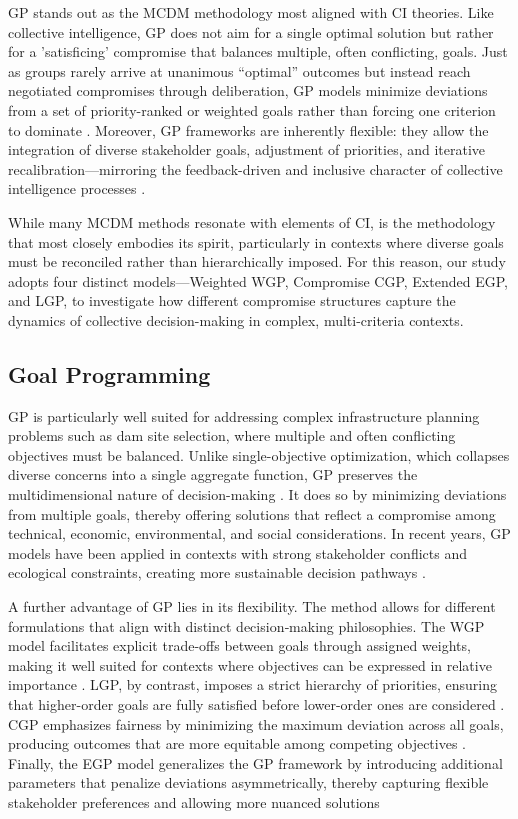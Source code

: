  \gls{GP} stands out as the MCDM methodology most aligned with CI theories. Like collective intelligence, \gls{GP} does not aim for a single optimal solution but rather for a 'satisficing' compromise that balances multiple, often conflicting, goals. Just as groups rarely arrive at unanimous “optimal” outcomes but instead reach negotiated compromises through deliberation, \gls{GP} models minimize deviations from a set of priority-ranked or weighted goals rather than forcing one criterion to dominate \cite{jones2010}. Moreover, \gls{GP} frameworks are inherently flexible: they allow the integration of diverse stakeholder goals, adjustment of priorities, and iterative recalibration—mirroring the feedback-driven and inclusive character of collective intelligence processes \cite{Borges2020}.

While many MCDM methods resonate with elements of CI,  is the methodology that most closely embodies its spirit, particularly in contexts where diverse goals must be reconciled rather than hierarchically imposed. For this reason, our study adopts four distinct  models—Weighted  \gls{WGP}, Compromise  \gls{CGP}, Extended  \gls{EGP}, and \gls{LGP}, to investigate how different compromise structures capture the dynamics of collective decision-making in complex, multi-criteria contexts.

\subsection{Goal Programming}
\gls{GP} is particularly well suited for addressing complex infrastructure planning problems such as dam site selection, where multiple and often conflicting objectives must be balanced. Unlike single-objective optimization, which collapses diverse concerns into a single aggregate function, \gls{GP} preserves the multidimensional nature of decision-making \cite{CHANG2007}. It does so by minimizing deviations from multiple goals, thereby offering solutions that reflect a compromise among technical, economic, environmental, and social considerations. In recent years, \gls{GP} models have been applied in contexts with strong stakeholder conflicts and ecological constraints, creating more sustainable decision pathways \cite{Castro2021}.

A further advantage of \gls{GP} lies in its flexibility. The method allows for different formulations that align with distinct decision‑making philosophies. The \gls{WGP} model facilitates explicit trade-offs between goals through assigned weights, making it well suited for contexts where objectives can be expressed in relative importance \cite{JONES2011}. \gls{LGP}, by contrast, imposes a strict hierarchy of priorities, ensuring that higher-order goals are fully satisfied before lower-order ones are considered \cite{jones2010}. \gls{CGP} emphasizes fairness by minimizing the maximum deviation across all goals, producing outcomes that are more equitable among competing objectives \cite{JONES2011}. Finally, the \gls{EGP} model generalizes the \gls{GP} framework by introducing additional parameters that penalize deviations asymmetrically, thereby capturing flexible stakeholder preferences and allowing more nuanced solutions \cite{jones2010}

